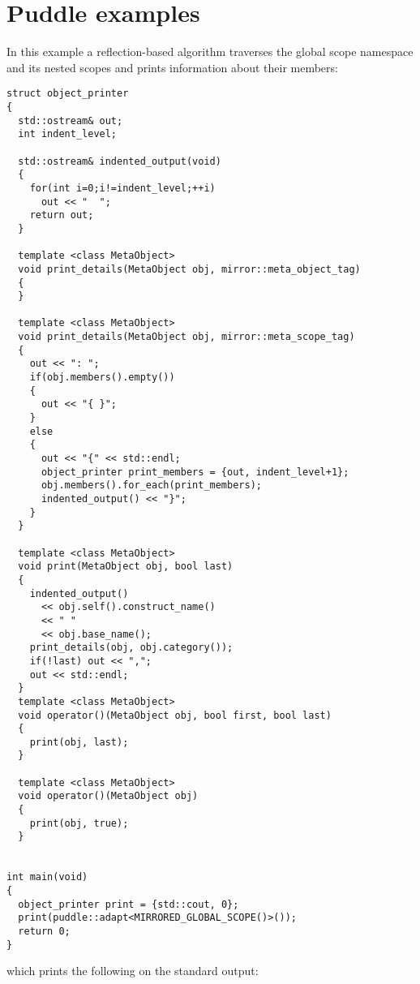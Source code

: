 \section{Puddle examples}
\label{appendix-puddle-examples}

In this example a reflection-based algorithm
traverses the global scope namespace and its nested scopes
and prints information about their members:

\begin{verbatim}
struct object_printer
{
  std::ostream& out;
  int indent_level;

  std::ostream& indented_output(void)
  {
    for(int i=0;i!=indent_level;++i)
      out << "  ";
    return out;
  }

  template <class MetaObject>
  void print_details(MetaObject obj, mirror::meta_object_tag)
  {
  }

  template <class MetaObject>
  void print_details(MetaObject obj, mirror::meta_scope_tag)
  {
    out << ": ";
    if(obj.members().empty())
    {
      out << "{ }";
    }
    else
    {
      out << "{" << std::endl;
      object_printer print_members = {out, indent_level+1};
      obj.members().for_each(print_members);
      indented_output() << "}";
    }
  }

  template <class MetaObject>
  void print(MetaObject obj, bool last)
  {
    indented_output()
      << obj.self().construct_name()
      << " "
      << obj.base_name();
    print_details(obj, obj.category());
    if(!last) out << ",";
    out << std::endl;
  }
  template <class MetaObject>
  void operator()(MetaObject obj, bool first, bool last)
  {
    print(obj, last);
  }

  template <class MetaObject>
  void operator()(MetaObject obj)
  {
    print(obj, true);
  }


int main(void)
{
  object_printer print = {std::cout, 0};
  print(puddle::adapt<MIRRORED_GLOBAL_SCOPE()>());
  return 0;
}
\end{verbatim}

which prints the following on the standard output:


